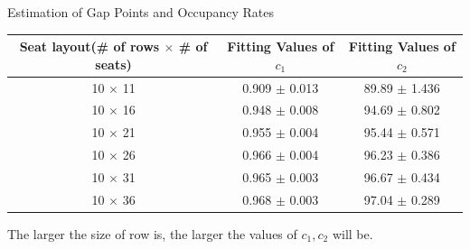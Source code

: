 \begin{frame}{Estimation of Gap Points and Occupancy Rates}
    \scriptsize
    \begin{table}[ht]
      \centering
      \begin{tabular}{|c|c|c|}
      \hline
       Seat layout(\# of rows $\times$ \# of seats) & Fitting Values of $c_1$ & Fitting Values of $c_2$  \\
      \hline
       10 $\times$ 11 & 0.909 $\pm$ 0.013  & 89.89 $\pm$ 1.436 \\
       10 $\times$ 16 & 0.948 $\pm$ 0.008  & 94.69 $\pm$ 0.802 \\
       10 $\times$ 21 & 0.955 $\pm$ 0.004 & 95.44 $\pm$ 0.571 \\
       10 $\times$ 26 & 0.966 $\pm$ 0.004 & 96.23 $\pm$ 0.386 \\
       10 $\times$ 31 & 0.965 $\pm$ 0.003 & 96.67 $\pm$ 0.434 \\
       10 $\times$ 36 & 0.968 $\pm$ 0.003 & 97.04 $\pm$ 0.289 \\
       \hline
      \end{tabular}
    \end{table}
    
    The larger the size of row is, the larger the values of $c_1, c_2$ will be. 
    
  
  \end{frame}



    

        
